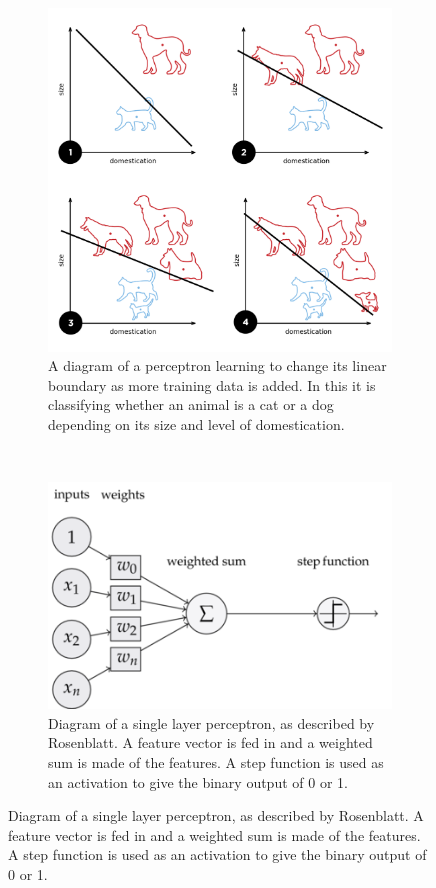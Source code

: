 \begin{figure}[h] %
\centering
\begin{subfigure}[t]{0.45\textwidth}
\centering
\includegraphics[width=\textwidth]{Perceptron_example}
\caption{A diagram of a perceptron learning to change its linear boundary as more training data is added. In this it is classifying whether an animal is a cat or a dog depending on its size and level of domestication.} 
\label{fig:Perceptron_example} 
\end{subfigure}
~
\begin{subfigure}[t]{0.45\textwidth}
\includegraphics[width=\textwidth]{SingleLayerPerceptron}
\caption{Diagram of a single layer perceptron, as described by Rosenblatt. A feature vector is fed in and a weighted sum is made of the features. A step function is used as an activation to give the binary output of 0 or 1.} 
\label{fig:SingleLayerPerceptron}
\end{subfigure}
\end{figure}

